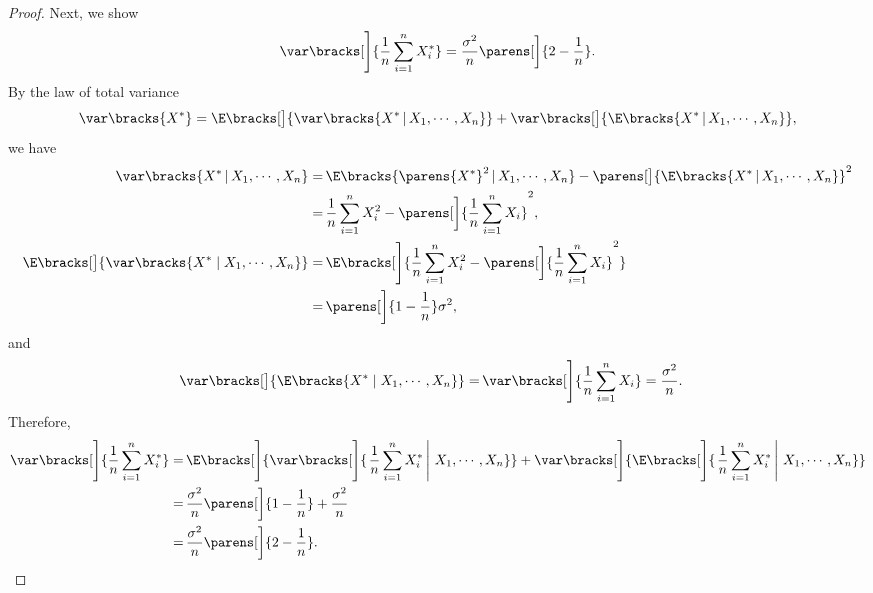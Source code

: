 \documentclass[12pt]{article}
\begin{document}
\begin{enumerate}[label=\textbf{\arabic*.}]
\begin{proof}
	Next, we show 
	\begin{align*}
		\var \bracks[\Bigg]{\frac{1}{n} \sum_{i=1}^n X_i^*} = \frac{\sigma^2}{n} \parens[\bigg]{2 - \frac{1}{n}}. 
	\end{align*}
	By the law of total variance 
	\begin{align*}
		\var \bracks{X^*} = \E \bracks[\big]{\var \bracks{X^* \,\vert\, X_1, \cdots, X_n}} + \var \bracks[\big]{\E \bracks{X^* \,\vert\, X_1, \cdots, X_n}}, 
	\end{align*}
	we have 
	\begin{align*}
		\var \bracks{X^* \,\vert\, X_1, \cdots, X_n} = & \, \E \bracks{\parens{X^*}^2 \,\vert\, X_1, \cdots, X_n} - \parens[\big]{\E \bracks{X^* \,\vert\, X_1, \cdots, X_n}}^2 \nonumber \\ 
		= & \, \frac{1}{n} \sum_{i=1}^n X_i^2 - \parens[\bigg]{\frac{1}{n} \sum_{i=1}^n X_i}^2, \\ 
		\E \bracks[\big]{\var \bracks{X^* \mid X_1, \cdots, X_n}} = & \, \E \bracks[\Bigg]{\frac{1}{n} \sum_{i=1}^n X_i^2 - \parens[\bigg]{\frac{1}{n} \sum_{i=1}^n X_i}^2} \nonumber \\ 
		= & \, \parens[\bigg]{1 - \frac{1}{n}} \sigma^2, 
	\end{align*}
	and
	\begin{align*}
		\var \bracks[\big]{\E \bracks{X^* \mid X_1, \cdots, X_n}} = & \, \var \bracks[\Bigg]{\frac{1}{n} \sum_{i=1}^n X_i} = \frac{\sigma^2}{n}. 
	\end{align*}
	Therefore, 
	\begin{align*}
		\var \bracks[\Bigg]{\frac{1}{n} \sum_{i=1}^n X^*_i} = & \, \E \bracks[\Bigg]{\var \bracks[\Bigg]{\left. \frac{1}{n} \sum_{i=1}^n X^*_i \,\right\vert\, X_1, \cdots, X_n}} + \var \bracks[\Bigg]{\E \bracks[\Bigg]{\left. \frac{1}{n} \sum_{i=1}^n X^*_i \,\right\vert\, X_1, \cdots, X_n}} \nonumber \\
		= & \, \frac{\sigma^2}{n} \parens[\bigg]{1 - \frac{1}{n}} + \frac{\sigma^2}{n} \nonumber \\ 
		= & \, \frac{\sigma^2}{n} \parens[\bigg]{2 - \frac{1}{n}}. 
	\end{align*}
	

\end{proof}
\end{enumerate}
\end{document}
